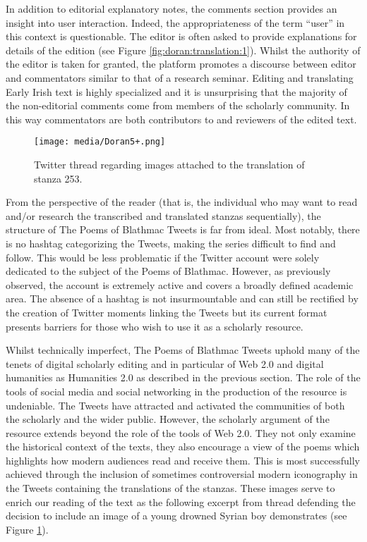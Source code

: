 \begin{paper}
\noindent In addition to editorial explanatory notes, the comments section provides an insight into user interaction. Indeed, the appropriateness of the term ``user'' in this context is questionable. The editor is often asked to provide explanations for details of the edition (see Figure \ref{fig:doran:translation:1}). Whilst the authority of the editor is taken for granted, the platform promotes a discourse between editor and commentators similar to that of a research seminar. Editing and translating Early Irish text is highly specialized and it is unsurprising that the majority of the non-editorial comments come from members of the scholarly community. In this way commentators are both contributors to and reviewers of the edited text.  

\begin{figure}[H]
    \centering
    \texttt{[image: media/Doran5+.png]}
    \caption[Twitter thread regarding images attached to the translation of stanza 253.]{Twitter thread regarding images attached to the translation of stanza 253.\footnotemark[4]}
    \label{fig:doran:twit_thread}
\end{figure}
\renewcommand*{\thefootnote}{\arabic{footnote}}

\noindent From the perspective of the reader (that is, the individual who may want to read and/or research the transcribed and translated stanzas sequentially), the structure of The Poems of Blathmac Tweets is far from ideal. Most notably, there is no hashtag categorizing the Tweets, making the series difficult to find and follow. This would be less problematic if the Twitter account were solely dedicated to the subject of the Poems of Blathmac. However, as previously observed, the account is extremely active and covers a broadly defined academic area. The absence of a hashtag is not insurmountable and can still be rectified by the creation of Twitter moments linking the Tweets but its current format presents barriers for those who wish to use it as a scholarly resource.

Whilst technically imperfect, The Poems of Blathmac Tweets uphold many of the tenets of digital scholarly editing and in particular of Web 2.0 and digital humanities as Humanities 2.0 as described in the previous section. The role of the tools of social media and social networking in the production of the resource is undeniable. The Tweets have attracted and activated the communities of both the scholarly and the wider public. However, the scholarly argument of the resource extends beyond the role of the tools of Web 2.0. They not only examine the historical context of the texts, they also encourage a view of the poems which highlights how modern audiences read and receive them. This is most successfully achieved through the inclusion of sometimes controversial modern iconography in the Tweets containing the translations of the stanzas. These images serve to enrich our reading of the text as the following excerpt from thread defending the decision to include an image of a young drowned Syrian boy demonstrates (see Figure \ref{fig:doran:twit_thread}).


\end{paper}
